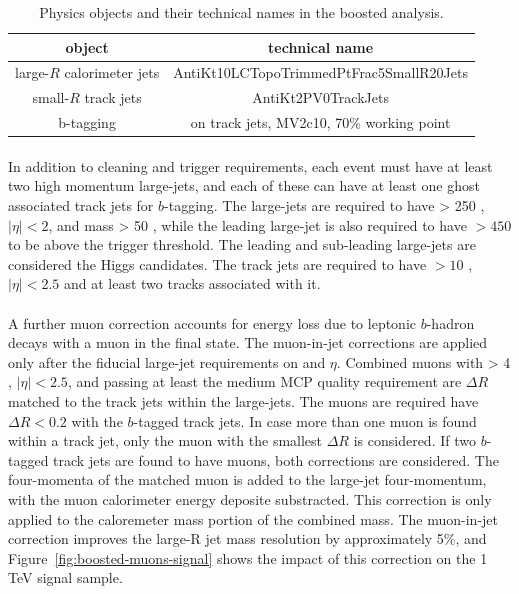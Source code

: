 \begin{table}[bhp]
\begin{center}
\begin{tabular}{c|c}
  object & technical name \\
  \hline
  large-$R$ calorimeter jets & AntiKt10LCTopoTrimmedPtFrac5SmallR20Jets \\
  small-$R$ track jets       & AntiKt2PV0TrackJets \\
  b-tagging                  & on track jets, MV2c10, 70$\%$ working point \\
\end{tabular}
\caption{Physics objects and their technical names in the boosted analysis.} %
\label{tab:boosted-objects}
\end{center}
\end{table}

\paragraph{}
In addition to cleaning and trigger requirements, each event must have at least two high momentum large-\R jets, and each of these can have at least one ghost associated track jets for $b$-tagging. The large-\R jets are required to have \pt > 250 \GeV , $|\eta| < 2$,  and mass > 50 \GeV, while the leading \pt large-\R jet is also required to have \pt $> 450$ \GeV to be above the trigger threshold. The leading and sub-leading large-\R jets are considered the Higgs candidates. The track jets are required to have \pt $> 10 $ \GeV , $|\eta| < 2.5$ and at least two tracks associated with it.

\paragraph{}
A further muon correction accounts for energy loss due to leptonic $b$-hadron decays with a muon in the final state. The muon-in-jet corrections are applied only after the fiducial large-\R jet requirements on \pt and $\eta$. Combined muons with \pt > 4 \GeV, $|\eta| < 2.5$, and passing at least the medium MCP quality requirement are $\Delta R$ matched to the track jets within the large-\R jets. The muons are required have $\Delta R < 0.2$ with the $b$-tagged track jets. In case more than one muon is found within a track jet, only the muon with the smallest $\Delta R$ is considered. If two $b$-tagged track jets are found to have muons, both corrections are considered. The four-momenta of the matched muon is added to the large-\R jet four-momentum, with the muon calorimeter energy deposite substracted. This correction is only applied to the caloremeter mass portion of the combined mass. The muon-in-jet correction improves the large-R jet mass resolution by approximately 5\%, and Figure~\ref{fig:boosted-muons-signal} shows the impact of this correction on the 1 TeV signal sample.

